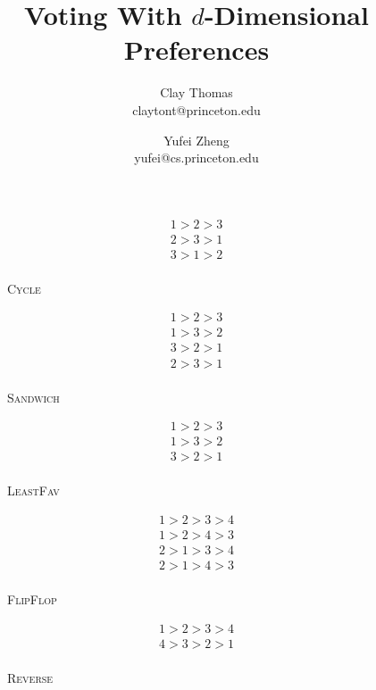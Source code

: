 \documentclass[12pt]{article}
\newcommand{\1}[1]{\mathds{1}[{#1}]}
\begin{document}

\title{
  \vspace{-0.5in}
  Voting With $d$-Dimensional Preferences
}
\date{}
\author{
  Clay Thomas\\
  claytont@princeton.edu 
  \and
  Yufei Zheng\\
  yufei@cs.princeton.edu
}


\maketitle


  \begin{wrapfigure}{r}{0.2\textwidth}
    \begin{center}
      \vspace{-0.5in}
      \begin{align*}
        1 > 2 > 3 \\
        2 > 3 > 1 \\
        3 > 1 > 2 \\
      \end{align*}
      \caption{\textsc{Cycle}}
      \vspace{-0.25in}
      \begin{align*}
        1 > 2 > 3 \\
        1 > 3 > 2 \\
        3 > 2 > 1 \\
        2 > 3 > 1 \\
      \end{align*}
      \caption{\textsc{Sandwich}}
      \vspace{-0.25in}
      \begin{align*}
        1 > 2 > 3 \\
        1 > 3 > 2 \\
        3 > 2 > 1 \\
      \end{align*}
      \caption{\textsc{LeastFav}}
      \vspace{-0.25in}
      \begin{align*}
        1 > 2 > 3 > 4 \\
        1 > 2 > 4 > 3 \\
        2 > 1 > 3 > 4 \\
        2 > 1 > 4 > 3 \\
      \end{align*}
      \caption{\textsc{FlipFlop}}
      \vspace{-0.25in}
      \begin{align*}
        1 > 2 > 3 > 4 \\
        4 > 3 > 2 > 1 \\
      \end{align*}
      \caption{\textsc{Reverse}}
    \end{center}
  \end{wrapfigure}
\end{document}
